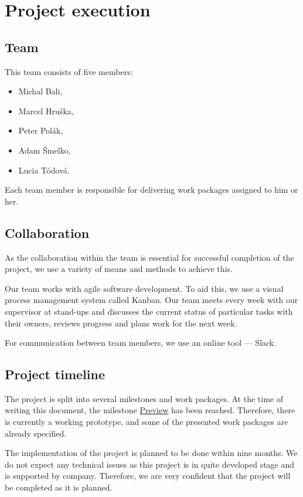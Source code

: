 \chapter{Project execution}

\section{Team}
This team consists of five members:

\begin{itemize}
	\item Michal Bali,
	\item Marcel Hruška,
	\item Peter Polák,
	\item Adam Šmelko,
	\item Lucia Tódová.
\end{itemize}

Each team member is responsible for delivering work packages assigned to him or her. 

\section{Collaboration}
As the collaboration within the team is essential for successful completion of the project, we use a variety of means and methods to achieve this. 

Our team works with agile software development. To aid this, we use a visual process management system called Kanban. Our team meets every week with our supervisor at stand-ups and discusses the current status of particular tasks with their owners, reviews progress and plans work for the next week.

For communication between team members, we use an online tool --- Slack.

\section{Project timeline}
The project is split into several milestones and work packages. At the time of writing this document, the milestone \hyperref[milestone_preview]{Preview} has been reached. Therefore, there is currently a working prototype, and some of the presented work packages are already specified. 

The implementation of the project is planned to be done within nine months. We do not expect any technical issues as this project is in quite developed stage and is supported by company. Therefore, we are very confident that the project will be completed as it is planned. 

